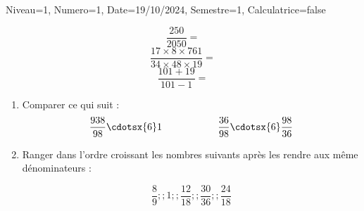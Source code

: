 \documentclass[a4paper,12pt]{article}
\begin{document}
\begin{Maquette}[DS]{Niveau=1, Numero=1, Date=19/10/2024, Semestre=1, Calculatrice=false}
\begin{exercice}
$$\dfrac{250}{2050}=$$
$$\dfrac{17\times 8\times 761}{34\times 48 \times 19}=$$
$$\dfrac{101+19}{101-1}=$$

\end{exercice}

\begin{exercice}
\begin{enumerate}
\item{} Comparer ce qui suit  :	
\[\dfrac{938}{98}\cdotsx{6} 1 \hspace{2cm}
\dfrac{36}{98}\cdotsx{6}\dfrac{98}{36}\]

\item{} Ranger dans l'ordre croissant les nombres suivants après les rendre aux même dénominateurs :

\[\dfrac{8}{9} ;; 1 ;; \dfrac{12}{18} ;; \dfrac{30}{36}  ;; \dfrac{24}{18}\]	

\end{enumerate}
\anserline[6]
\end{exercice}

\end{Maquette}
\end{document}
